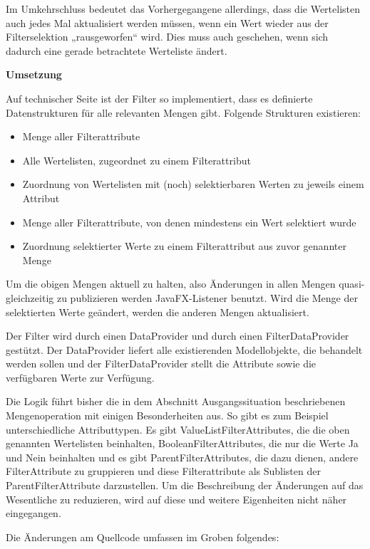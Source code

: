 Im Umkehrschluss bedeutet das Vorhergegangene allerdings, dass die Wertelisten auch jedes Mal aktualisiert werden müssen, wenn ein Wert wieder aus der Filterselektion „rausgeworfen“ wird. Dies muss auch geschehen, wenn sich dadurch eine gerade betrachtete Werteliste ändert.

\textbf{Umsetzung}

Auf technischer Seite ist der Filter so implementiert, dass es definierte Datenstrukturen für alle relevanten Mengen gibt. Folgende Strukturen existieren:

\begin{itemize}
	\item Menge aller Filterattribute
	\item Alle Wertelisten, zugeordnet zu einem Filterattribut
	\item Zuordnung von Wertelisten mit (noch) selektierbaren Werten zu jeweils einem Attribut
	\item Menge aller Filterattribute, von denen mindestens ein Wert selektiert wurde
	\item Zuordnung selektierter Werte zu einem Filterattribut aus zuvor genannter Menge
\end{itemize}

Um die obigen Mengen aktuell zu halten, also Änderungen in allen Mengen quasi-gleichzeitig zu publizieren werden JavaFX-Listener benutzt. Wird die Menge der selektierten Werte geändert, werden die anderen Mengen aktualisiert.

Der Filter wird durch einen DataProvider und durch einen FilterDataProvider gestützt. Der DataProvider liefert alle existierenden Modellobjekte, die behandelt werden sollen und der FilterDataProvider stellt die Attribute sowie die verfügbaren Werte zur Verfügung.

Die Logik führt bisher die in dem Abschnitt Ausgangssituation beschriebenen Mengenoperation mit einigen Besonderheiten aus. So gibt es zum Beispiel unterschiedliche Attributtypen. Es gibt ValueListFilterAttributes, die die oben genannten Wertelisten beinhalten, BooleanFilterAttributes, die nur die Werte Ja und Nein beinhalten und es gibt ParentFilterAttributes, die dazu dienen, andere FilterAttribute zu gruppieren und diese Filterattribute als Sublisten der ParentFilterAttribute darzustellen. Um die Beschreibung der Änderungen auf das Wesentliche zu reduzieren, wird auf diese und weitere Eigenheiten nicht näher eingegangen.

Die Änderungen am Quellcode umfassen im Groben folgendes:

